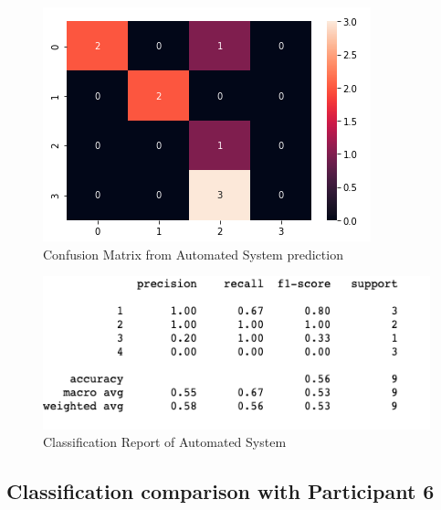 \pagebreak

\begin{figure}[!htp]
    \includegraphics[width=\textwidth]{Images/a5.png}
    \caption{Confusion Matrix from Automated System prediction}
    \label{fig:f11}
\end{figure}

\begin{figure}[!htp]
    \includegraphics[width=\textwidth]{Images/a5r.png}
    \caption{Classification Report of Automated System}
    \label{fig:f11}
\end{figure}

\pagebreak
\subsection*{Classification comparison with Participant 6}

